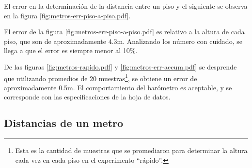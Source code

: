 \documentclass[main]{subfiles}
\begin{document}
El error en la determinación de la distancia entre un piso y el siguiente se observa en la figura \ref{fig:metros-err-piso-a-piso.pdf}.

El error de la figura \ref{fig:metros-err-piso-a-piso.pdf} es relativo a la altura de cada piso, que son de aproximadamente 4.3m. Analizando los número con cuidado, se llega a que el error es siempre menor al 10\%.

De las figuras \ref{fig:metros-rapido.pdf} y \ref{fig:metros-err-accum.pdf} se desprende que utilizando promedios de 20 muestras\footnote{Esta es la cantidad de muestras que se promediaron para determinar la altura cada vez en cada piso en el experimento ``rápido''.}, se obtiene un error de aproximadamente 0.5m. El comportamiento del barómetro es aceptable, y se corresponde con las especificaciones de la hoja de datos.


\vspace{-10pt}
\begin{figure}[h!]
\centering
{}
  \caption{}
\end{figure}

\subsection{Distancias de un metro}
\end{document}
